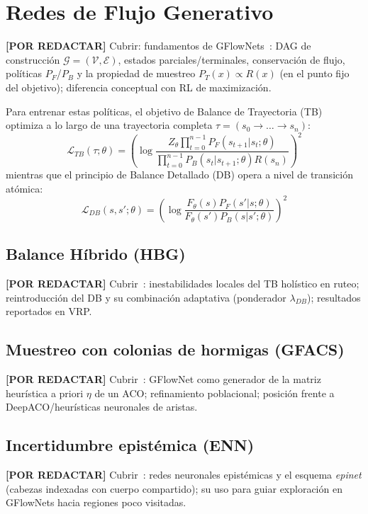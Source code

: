 \documentclass[12pt]{report}
\newcommand{\pendiente}[1]{\par\noindent\colorbox{lightbg}{%
  \begin{minipage}{0.94\linewidth}\small
  \textcolor{uanlgold}{\textbf{[POR REDACTAR]}} #1
  \end{minipage}}\par\medskip}
\begin{document}
\section{Redes de Flujo Generativo}\label{sec:gfn}
\pendiente{Cubrir: fundamentos de GFlowNets~\cite{Bengio2023Foundations}:
DAG de construcci\'on $\mathcal{G}=(\mathcal{V},\mathcal{E})$, estados
parciales/terminales, conservaci\'on de flujo, pol\'iticas $P_F$/$P_B$ y la
propiedad de muestreo $P_T(x)\propto R(x)$ (en el punto fijo del objetivo);
diferencia conceptual con RL de maximizaci\'on.}

Para entrenar estas pol\'iticas, el objetivo de Balance de Trayectoria
(TB)~\cite{Malkin2022Trajectory} optimiza a lo largo de una trayectoria completa
$\tau = (s_0 \to \dots \to s_n)$:
\begin{equation}
\mathcal{L}_{TB}(\tau; \theta) = \left( \log \frac{Z_\theta \prod_{t=0}^{n-1} P_F(s_{t+1}|s_t; \theta)}{\prod_{t=0}^{n-1} P_B(s_t|s_{t+1}; \theta) R(s_n)} \right)^2
\label{eq:tb}
\end{equation}
mientras que el principio de Balance Detallado (DB) opera a nivel de
transici\'on at\'omica:
\begin{equation}
\mathcal{L}_{DB}(s, s'; \theta) = \left( \log \frac{F_\theta(s) P_F(s'|s; \theta)}{F_\theta(s') P_B(s|s'; \theta)} \right)^2
\label{eq:db}
\end{equation}

\subsection{Balance H\'ibrido (HBG)}\label{sec:hbg}
\pendiente{Cubrir~\cite{Zhang2025Hybrid}: inestabilidades locales del TB
hol\'istico en ruteo; reintroducci\'on del DB y su combinaci\'on adaptativa
(ponderador $\lambda_{DB}$); resultados reportados en VRP.}

\subsection{Muestreo con colonias de hormigas (GFACS)}\label{sec:gfacs}
\pendiente{Cubrir~\cite{Kim2024GFACS}: GFlowNet como generador de la matriz
heur\'istica a priori $\eta$ de un ACO; refinamiento poblacional; posici\'on
frente a DeepACO/heur\'isticas neuronales de aristas.}

\subsection{Incertidumbre epist\'emica (ENN)}\label{sec:enn}
\pendiente{Cubrir~\cite{ENN_GFN_2025}: redes neuronales epist\'emicas y el
esquema \textit{epinet} (cabezas indexadas con cuerpo compartido); su uso para
guiar exploraci\'on en GFlowNets hacia regiones poco visitadas.}
\end{document}
